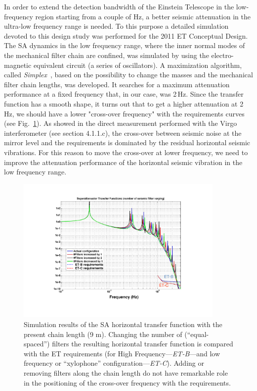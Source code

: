 In order to extend the detection bandwidth of the Einstein Telescope in the low-frequency region starting from a couple of Hz, a better seismic attenuation in the ultra-low frequency range is needed. To this purpose a detailed simulation devoted to this design study was performed for the 2011 ET Conceptual Design. The SA dynamics in the low frequency range, where the inner normal modes of the mechanical filter chain are confined, was simulated by using the electro-magnetic equivalent circuit (a series of oscillators). 
A maximization algorithm, called \emph{Simplex}~\cite{Different2008_SecondEdition}, based on the possibility to change the masses and the mechanical filter chain lengths, was developed. It searches for a maximum attenuation performance at a fixed frequency that, in our case, was 2\,Hz.  Since the transfer function has a smooth shape, it turns out that to get a higher attenuation at 2\,Hz, we should have a lower  "cross-over frequency" with the requirements curves (see Fig.~\ref{Par4Fig1}). As showed in the direct measurement performed with the Virgo interferometer (see section 4.1.1.c), the cross-over between seismic noise at the mirror level and the requirements is dominated by the residual horizontal seismic vibrations. For this reason to move the cross-over at lower frequency, we need to improve  the attenuation performance of the horizontal seismic vibration in the low frequency range.
%
\begin{figure}[t]
	\begin{center}
		\includegraphics[width=0.9\textwidth]{Detector/SASandSUS/SuspensionSystems/Suspension_Figures/Par4-Fig1.pdf}
			\caption{Simulation results of the SA horizontal transfer function with the present chain length (9 m). Changing the number of (``equal-spaced'') filters the resulting horizontal transfer function is compared with the ET requirements (for High Frequency---\emph{ET-B}---and low frequency or ``xylophone'' configuration---\emph{ET-C}). Adding or removing filters along the chain length do not have remarkable role in the positioning of the cross-over frequency with the requirements.}
\label{Par4Fig1}
	\end{center}
\end{figure}
